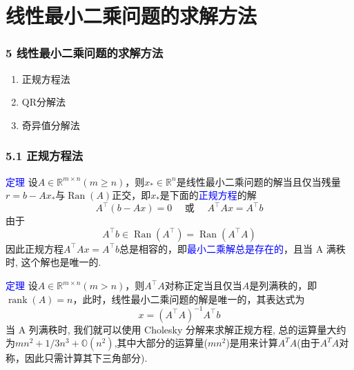 \documentclass[notheorems,serif]{beamer}
\begin{document}
\section{线性最小二乘问题的求解方法}
\begin{frame}
\frametitle{5 线性最小二乘问题的求解方法}
\begin{enumerate}[5.1]
	\item 正规方程法
	\item QR分解法
	\item 奇异值分解法
\end{enumerate}
\end{frame}

\begin{frame}
\frametitle{5.1 正规方程法}
\textcolor{blue}{定理} 设$A \in \mathbb{R}^{m \times n}(m \geq n)$，则$x_{*} \in \mathbb{R}^{n}$是线性最小二乘问题的解当且仅当残量$r=b-A x_{*}$与$\operatorname{Ran}(A)$正交，即$x_{*}$是下面的\textcolor{blue}{正规方程}的解
\begin{equation}
A^{\top}(b-A x)=0 \quad \text { 或 } \quad A^{\top} A x=A^{\top} b
\end{equation}
由于
$$
A^{\top} b \in \operatorname{Ran}\left(A^{\top}\right)=\operatorname{Ran}\left(A^{\top} A\right)
$$
因此正规方程$A^{\top} A x=A^{\top} b$总是相容的，即\textcolor{blue}{最小二乘解总是存在的}，且当 A 满秩时, 这个解也是唯一的.
\end{frame}

\begin{frame}
\textcolor{blue}{定理} 设$A \in \mathbb{R}^{m \times n}(m>n)$，则$A^{\top} A$对称正定当且仅当$A$是列满秩的，即
$\operatorname{rank}(A)=n$，此时，线性最小二乘问题的解是唯一的，其表达式为
$$
x=\left(A^{\top} A\right)^{-1} A^{\top} b
$$
当 A 列满秩时, 我们就可以使用 Cholesky 分解来求解正规方程, 总的运算量大约为$mn^{2}+1/3n^{3}+\mathbb{O}(n^{2})$,其中大部分的运算量($mn^{2}$)是用来计算$A^{T}A$(由于$A^{T}A$对称，因此只需计算其下三角部分).
\end{frame}
\end{document}
